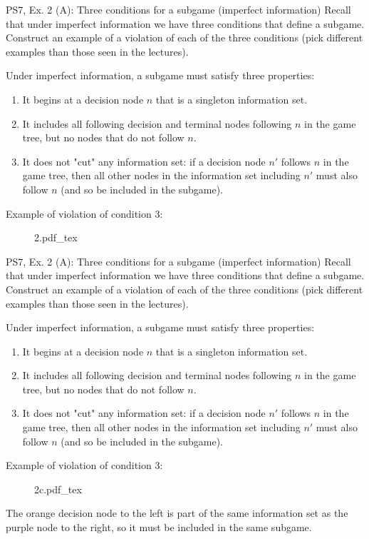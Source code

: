 \begin{frame}{PS7, Ex. 2 (A): Three conditions for a subgame (imperfect information)}
  Recall that under imperfect information we have three conditions that define a subgame. Construct an example of a violation of each of the three conditions (pick different examples than those seen in the lectures).
  \begin{multicols}{2}
    Under imperfect information, a subgame must satisfy three properties:
    \begin{enumerate}
      \item It begins at a decision node $n$ that is a singleton information set.
      \item It includes all following decision and terminal nodes following $n$ in the game tree, but no nodes that do not follow $n$.
      \item It does not "cut" any information set: if a decision node $n'$ follows $n$ in the game tree, then all other nodes in the information set including $n'$ must also follow $n$ (and so be included in the subgame).
    \end{enumerate}
    \vfill\null\columnbreak
    Example of violation of condition 3:
    \vspace{-4pt}
    \begin{figure}[!h]
      \center
      \def\svgwidth{\columnwidth}
      {2.pdf_tex}
    \end{figure}
    \vfill\null
  \end{multicols}
\end{frame}
\begin{frame}{PS7, Ex. 2 (A): Three conditions for a subgame (imperfect information)}
  Recall that under imperfect information we have three conditions that define a subgame. Construct an example of a violation of each of the three conditions (pick different examples than those seen in the lectures).
  \begin{multicols}{2}
    Under imperfect information, a subgame must satisfy three properties:
    \begin{enumerate}
      \item It begins at a decision node $n$ that is a singleton information set.
      \item It includes all following decision and terminal nodes following $n$ in the game tree, but no nodes that do not follow $n$.
      \item It does not "cut" any information set: if a decision node $n'$ follows $n$ in the game tree, then all other nodes in the information set including $n'$ must also follow $n$ (and so be included in the subgame).
    \end{enumerate}
    \vfill\null\columnbreak
    Example of violation of condition 3:
    \vspace{-4pt}
    \begin{figure}[!h]
      \center
      \def\svgwidth{\columnwidth}
      {2c.pdf_tex}
    \end{figure}
    The orange decision node to the left is part of the same information set as the purple node to the right, so it must be included in the same subgame.
    \vfill\null
  \end{multicols}
\end{frame}
